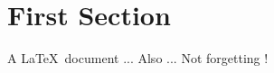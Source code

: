 \documentclass{article}
\begin{document}
\tableofcontents

\section{First Section}

A \LaTeX \ document \cite{einstein} ...
Also \cite{knuthwebsite}...
Not forgetting \cite{latexcompanion}!



\end{document}
